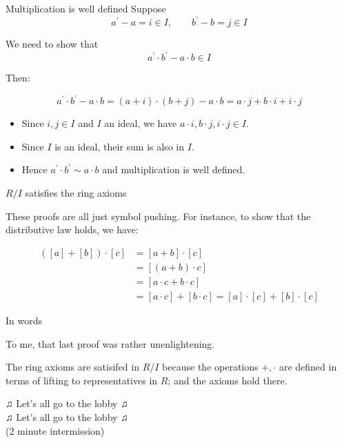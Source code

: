 \documentclass{beamer}
\begin{document}
\begin{frame}{Multiplication is well defined}
Suppose $$a^\prime-a=i\in I,\qquad b^\prime-b=j\in I$$  

We need to show that $$a^\prime\cdot b^\prime-a\cdot b\in I$$

Then:


$$a^\prime\cdot b^\prime-a\cdot b=(a+i)\cdot (b+j)-a\cdot b=a\cdot j+b\cdot i+i\cdot j$$

\begin{itemize}
\item Since $i, j\in I$ and $I$ an ideal, we have $a\cdot i, b\cdot j, i\cdot j\in I$. 
\item  Since $I$ is an ideal, their sum is also in $I$. 
\item  Hence $a^\prime\cdot b^\prime\sim a\cdot b$ and multiplication is well defined.
\end{itemize}

\end{frame}

\begin{frame}{$R/I$ satisfies the ring axioms}

These proofs are all just symbol pushing.  For instance, to show that the distributive law holds, we have:

\begin{align*}
([a]+[b])\cdot [c]& =[a+b]\cdot[c] \\
& =[(a+b)\cdot c] \\
&=[a\cdot c+b\cdot c] \\
&=[a\cdot c]+[b\cdot c]=[a]\cdot [c]+[b]\cdot [c]
\end{align*}
\end{frame}


\begin{frame}{In words}

To me, that last proof was rather unenlightening.

The ring axioms are satisifed in $R/I$ because the operations $+, \cdot$ are defined in terms of lifting to representatives in $R$; and the axioms hold there.



\end{frame}


\begin{frame}[plain,c]

\begin{center}

\Huge

$\twonotes$ Let's all go to the lobby $\twonotes$ \\ $\twonotes$ Let's all go to the lobby $\twonotes$ \\
(2 minute intermission)
\end{center}

\end{frame}
\end{document}
